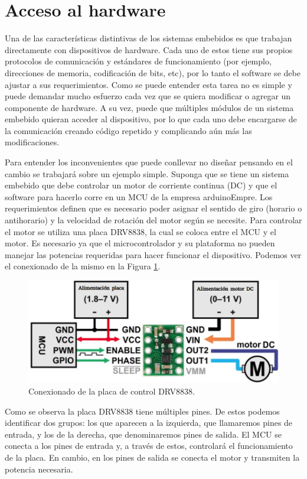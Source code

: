 \minitoc



\section{Acceso al hardware}
\label{Accesoalhardware}
Una de las características distintivas de los sistemas embebidos es que trabajan directamente con dispositivos de hardware. Cada uno de estos tiene sus propios protocolos de comunicación y estándares de funcionamiento (por ejemplo, direcciones de memoria, codificación de bits, etc), por lo tanto el software se debe ajustar a sus requerimientos. Como se puede entender esta tarea no es simple y puede demandar mucho esfuerzo cada vez que se quiera modificar o agregar un componente de hardware. A su vez, puede que múltiples módulos de un sistema embebido quieran acceder al dispositivo, por lo que cada uno debe encargarse de la comunicación creando código repetido y complicando aún más las modificaciones. 

Para entender los inconvenientes que puede conllevar no diseñar pensando en el cambio se trabajará sobre un ejemplo simple. Suponga que se tiene un sistema embebido que debe controlar un motor de corriente continua (\gls{DC}) y que el software para hacerlo corre en un \gls{MCU} de la empresa \gls{arduinoEmpre}. Los requerimientos definen que es necesario poder asignar el sentido de giro (horario o antihorario) y la velocidad de rotación del motor según se necesite. Para controlar el motor se utiliza una placa \gls{DRV8838}, la cual se coloca entre el \gls{MCU} y el motor. Es necesario ya que el microcontrolador y su plataforma no pueden manejar las potencias requeridas para hacer funcionar el dispositivo. Podemos ver el conexionado de la mismo en la Figura \ref{drv8838}.

\begin{figure}[h]
    \centering
    \includegraphics[width=0.65\linewidth]{drv8838.png}
    \caption{Conexionado de la placa de control DRV8838.}
    \label{drv8838}
\end{figure}

Como se observa la placa \gls{DRV8838} tiene múltiples pines. De estos podemos identificar dos grupos: los que aparecen a la izquierda, que llamaremos pines de entrada, y los de la derecha, que denominaremos pines de salida. El \gls{MCU} se conecta a los pines de entrada y, a través de estos, controlará el funcionamiento de la placa. En cambio, en los pines de salida se conecta el motor y transmiten la potencia necesaria.

